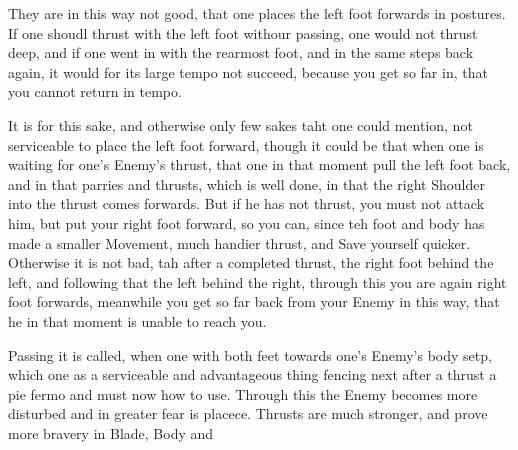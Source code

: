 They are in this way not good, that one places the left foot forwards
in postures. If one shoudl thrust with the left foot withour passing,
one would not thrust deep, and if one went in with the rearmost foot,
and in the same steps back again, it would for its large tempo not
succeed, because you get so far in, that you cannot return in tempo.


It is for this sake, and otherwise only few sakes taht one could
mention, not serviceable to place the left foot forward, though it
could be that when one is waiting for one's Enemy's thrust, that one
in that moment pull the left foot back, and in that parries and
thrusts, which is well done, in that the right Shoulder into the thrust
comes forwards. But if he has not thrust, you must not attack him, but
put your right foot forward, so you can, since teh foot and body has
made a smaller Movement, much handier thrust, and Save yourself
quicker. Otherwise it is not bad, tah after a completed thrust, the
right foot behind the left, and following that the left behind the
right, through this you are again right foot forwards, meanwhile you
get so far back from your Enemy in this way, that he in that moment is
unable to reach you.




Passing it is called, when one with both feet towards one's Enemy's
body setp, which one as a serviceable and advantageous thing fencing
next after a thrust a pie fermo and must now how to use. Through this
the Enemy becomes more disturbed and in greater fear is
placece. Thrusts are much stronger, and prove more
bravery in Blade, Body and
